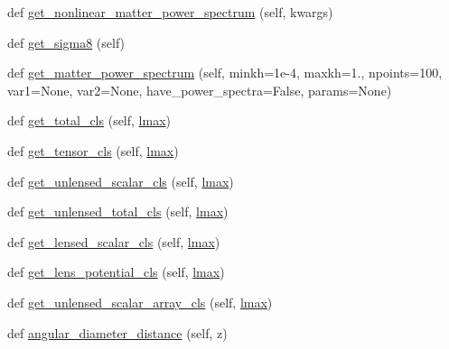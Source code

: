 \begin{DoxyCompactItemize}
\item 
def \mbox{\hyperlink{classcamb_1_1camb_1_1CAMBdata_a360e97e0d8883903266ec0781188120c}{get\+\_\+nonlinear\+\_\+matter\+\_\+power\+\_\+spectrum}} (self, kwargs)
\item 
def \mbox{\hyperlink{classcamb_1_1camb_1_1CAMBdata_a1891baad8b4e53b2a1f2d136ddbef5e2}{get\+\_\+sigma8}} (self)
\item 
def \mbox{\hyperlink{classcamb_1_1camb_1_1CAMBdata_ab18c1f8670933c20948c80ecf6d89fbf}{get\+\_\+matter\+\_\+power\+\_\+spectrum}} (self, minkh=1e-\/4, maxkh=1., npoints=100, var1=\+None, var2=\+None, have\+\_\+power\+\_\+spectra=\+False, params=\+None)
\item 
def \mbox{\hyperlink{classcamb_1_1camb_1_1CAMBdata_aeb52734403fbeae2815b9fb8fa6227d5}{get\+\_\+total\+\_\+cls}} (self, \mbox{\hyperlink{plotTT_8m_aa9755a1150619f3bbad65080cf613ef8}{lmax}})
\item 
def \mbox{\hyperlink{classcamb_1_1camb_1_1CAMBdata_a3ae85ffc476cbae0733fee4ab2283cb9}{get\+\_\+tensor\+\_\+cls}} (self, \mbox{\hyperlink{plotTT_8m_aa9755a1150619f3bbad65080cf613ef8}{lmax}})
\item 
def \mbox{\hyperlink{classcamb_1_1camb_1_1CAMBdata_a43faed309e32f7e4c075c0f8be5bcab8}{get\+\_\+unlensed\+\_\+scalar\+\_\+cls}} (self, \mbox{\hyperlink{plotTT_8m_aa9755a1150619f3bbad65080cf613ef8}{lmax}})
\item 
def \mbox{\hyperlink{classcamb_1_1camb_1_1CAMBdata_a44fa4354fe9d41ca6b275e078c17d983}{get\+\_\+unlensed\+\_\+total\+\_\+cls}} (self, \mbox{\hyperlink{plotTT_8m_aa9755a1150619f3bbad65080cf613ef8}{lmax}})
\item 
def \mbox{\hyperlink{classcamb_1_1camb_1_1CAMBdata_a025677b02513d9fe4c19676203f72e8c}{get\+\_\+lensed\+\_\+scalar\+\_\+cls}} (self, \mbox{\hyperlink{plotTT_8m_aa9755a1150619f3bbad65080cf613ef8}{lmax}})
\item 
def \mbox{\hyperlink{classcamb_1_1camb_1_1CAMBdata_a4afbb696ceabc6414275667983733d96}{get\+\_\+lens\+\_\+potential\+\_\+cls}} (self, \mbox{\hyperlink{plotTT_8m_aa9755a1150619f3bbad65080cf613ef8}{lmax}})
\item 
def \mbox{\hyperlink{classcamb_1_1camb_1_1CAMBdata_a430cc8ae7b233dfb8a36f99882d32377}{get\+\_\+unlensed\+\_\+scalar\+\_\+array\+\_\+cls}} (self, \mbox{\hyperlink{plotTT_8m_aa9755a1150619f3bbad65080cf613ef8}{lmax}})
\item 
def \mbox{\hyperlink{classcamb_1_1camb_1_1CAMBdata_abbd4962602adc08e9ebecc753ac6f03d}{angular\+\_\+diameter\+\_\+distance}} (self, z)
\item 

\end{DoxyCompactItemize}
